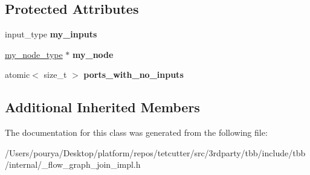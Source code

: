 \subsection*{Protected Attributes}
\begin{DoxyCompactItemize}
\item 
\hypertarget{classinternal_1_1join__node__FE_3_01reserving_00_01InputTuple_00_01OutputTuple_01_4_adaefed3d9d85dc271f40b27078ef7371}{}input\+\_\+type {\bfseries my\+\_\+inputs}\label{classinternal_1_1join__node__FE_3_01reserving_00_01InputTuple_00_01OutputTuple_01_4_adaefed3d9d85dc271f40b27078ef7371}

\item 
\hypertarget{classinternal_1_1join__node__FE_3_01reserving_00_01InputTuple_00_01OutputTuple_01_4_aede49bf458b0d70e3e7b25a18aaa15d4}{}\hyperlink{classinternal_1_1join__node__base}{my\+\_\+node\+\_\+type} $\ast$ {\bfseries my\+\_\+node}\label{classinternal_1_1join__node__FE_3_01reserving_00_01InputTuple_00_01OutputTuple_01_4_aede49bf458b0d70e3e7b25a18aaa15d4}

\item 
\hypertarget{classinternal_1_1join__node__FE_3_01reserving_00_01InputTuple_00_01OutputTuple_01_4_a35f89040efc87df8429159ddc9cf9b3e}{}atomic$<$ size\+\_\+t $>$ {\bfseries ports\+\_\+with\+\_\+no\+\_\+inputs}\label{classinternal_1_1join__node__FE_3_01reserving_00_01InputTuple_00_01OutputTuple_01_4_a35f89040efc87df8429159ddc9cf9b3e}

\end{DoxyCompactItemize}
\subsection*{Additional Inherited Members}


The documentation for this class was generated from the following file\+:\begin{DoxyCompactItemize}
\item 
/\+Users/pourya/\+Desktop/platform/repos/tetcutter/src/3rdparty/tbb/include/tbb/internal/\+\_\+flow\+\_\+graph\+\_\+join\+\_\+impl.\+h\end{DoxyCompactItemize}
